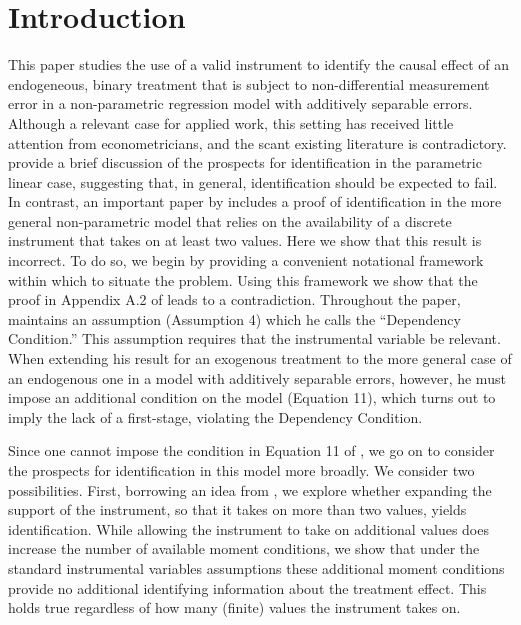 \section{Introduction}

This paper studies the use of a valid instrument to identify the causal effect of an endogeneous, binary treatment that is subject to non-differential measurement error in a non-parametric regression model with additively separable errors. 
Although a relevant case for applied work, this setting has received little attention from econometricians, and the scant existing literature is contradictory.
\cite{FL} provide a brief discussion of the prospects for identification in the parametric linear case, suggesting that, in general, identification should be expected to fail.
In contrast, an important paper by \cite{Mahajan} includes a proof of identification in the more general non-parametric model that relies on the availability of a discrete instrument that takes on at least two values.   
Here we show that this result is incorrect. 
To do so, we begin by providing a convenient notational framework within which to situate the problem.
Using this framework we show that the proof in Appendix A.2 of \cite{Mahajan} leads to a contradiction.
Throughout the paper, \cite{Mahajan} maintains an assumption (Assumption 4) which he calls the ``Dependency Condition.'' 
This assumption requires that the instrumental variable be relevant.
When extending his result for an exogenous treatment to the more general case of an endogenous one in a model with additively separable errors, however, he must impose an additional condition on the model (Equation 11), which turns out to imply the lack of a first-stage, violating the Dependency Condition.

Since one cannot impose the condition in Equation 11 of \cite{Mahajan}, we go on to consider the prospects for identification in this model more broadly.
We consider two possibilities.
First, borrowing an idea from \cite{Lewbel}, we explore whether expanding the support of the instrument, so that it takes on more than two values, yields identification.
While allowing the instrument to take on additional values does increase the number of available moment conditions, we show that under the standard instrumental variables assumptions these additional moment conditions provide no additional identifying information about the treatment effect.
This holds true regardless of how many (finite) values the instrument takes on.

